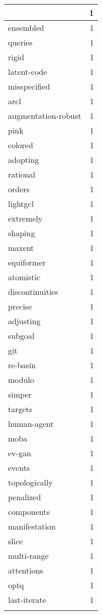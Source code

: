 \begin{table}[h]
\begin{tabular}{|l|r|}
{\hline
coalmine & 1 \\
\hline
ensembled & 1 \\
\hline
queries & 1 \\
\hline
rigid & 1 \\
\hline
latent-code & 1 \\
\hline
misspecified & 1 \\
\hline
arcl & 1 \\
\hline
augmentation-robust & 1 \\
\hline
pink & 1 \\
\hline
colored & 1 \\
\hline
adopting & 1 \\
\hline
rational & 1 \\
\hline
orders & 1 \\
\hline
lightgcl & 1 \\
\hline
extremely & 1 \\
\hline
shaping & 1 \\
\hline
maxent & 1 \\
\hline
equiformer & 1 \\
\hline
atomistic & 1 \\
\hline
discontinuities & 1 \\
\hline
precise & 1 \\
\hline
adjusting & 1 \\
\hline
subgoal & 1 \\
\hline
git & 1 \\
\hline
re-basin & 1 \\
\hline
modulo & 1 \\
\hline
simper & 1 \\
\hline
targets & 1 \\
\hline
human-agent & 1 \\
\hline
moba & 1 \\
\hline
ev-gan & 1 \\
\hline
events & 1 \\
\hline
topologically & 1 \\
\hline
penalized & 1 \\
\hline
components & 1 \\
\hline
manifestation & 1 \\
\hline
slice & 1 \\
\hline
multi-range & 1 \\
\hline
attentions & 1 \\
\hline
optq & 1 \\
\hline
last-iterate & 1 \\
\hline
}
\end{tabular}
\end{table}
